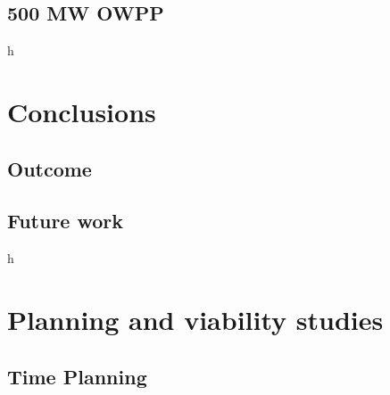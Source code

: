\documentclass[a4paper,11pt, titlepage, twoside]{article}
\begin{document}
\subsection{500 MW OWPP}
h

\section{Conclusions}\label{Conclusions}
\subsection{Outcome}
\subsection{Future work}
h
\section{Planning and viability studies}\label{Planning}

\subsection{Time Planning}
\end{document}
